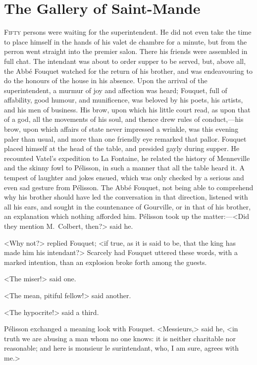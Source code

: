 \chapter{The Gallery of Saint-Mande}

\lettrine{F}{ifty} persons were waiting for the superintendent. He did not even take the time to place himself in the hands of his valet de chambre for a minute, but from the perron went straight into the premier salon. There his friends were assembled in full chat. The intendant was about to order supper to be served, but, above all, the Abbé Fouquet watched for the return of his brother, and was endeavouring to do the honours of the house in his absence. Upon the arrival of the superintendent, a murmur of joy and affection was heard; Fouquet, full of affability, good humour, and munificence, was beloved by his poets, his artists, and his men of business. His brow, upon which his little court read, as upon that of a god, all the movements of his soul, and thence drew rules of conduct,—his brow, upon which affairs of state never impressed a wrinkle, was this evening paler than usual, and more than one friendly eye remarked that pallor. Fouquet placed himself at the head of the table, and presided gayly during supper. He recounted Vatel's expedition to La Fontaine, he related the history of Menneville and the skinny fowl to Pélisson, in such a manner that all the table heard it. A tempest of laughter and jokes ensued, which was only checked by a serious and even sad gesture from Pélisson. The Abbé Fouquet, not being able to comprehend why his brother should have led the conversation in that direction, listened with all his ears, and sought in the countenance of Gourville, or in that of his brother, an explanation which nothing afforded him. Pélisson took up the matter:—<Did they mention M.~Colbert, then?> said he.

<Why not?> replied Fouquet; <if true, as it is said to be, that the king has made him his intendant?> Scarcely had Fouquet uttered these words, with a marked intention, than an explosion broke forth among the guests.

<The miser!> said one.

<The mean, pitiful fellow!> said another.

<The hypocrite!> said a third.

Pélisson exchanged a meaning look with Fouquet. <Messieurs,> said he, <in truth we are abusing a man whom no one knows: it is neither charitable nor reasonable; and here is monsieur le surintendant, who, I am sure, agrees with me.>

